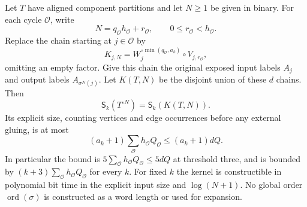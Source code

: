 \begin{theorem}
\label{thm:route-kernel}
Let $T$ have aligned component partitions and let $N\geq1$ be given in binary.
For each cycle $\mathcal O$, write
\[
 N=q_{\mathcal O}h_{\mathcal O}+r_{\mathcal O},
 \qquad 0\leq r_{\mathcal O}<h_{\mathcal O}.
\]
Replace the chain starting at $j\in\mathcal O$ by
\[
 K_{j,N}
 =W_j^{\circ\min(q_{\mathcal O},a_k)}
      \circ V_{j,r_{\mathcal O}},
\]
omitting an empty factor.  Give this chain the original exposed input labels
$A_j$ and output labels $A_{\sigma^N(j)}$.  Let $K(T,N)$ be the disjoint union
of these $d$ chains.  Then
\[
 \mathsf S_k(T^{\circ N})=\mathsf S_k(K(T,N)).
\]
Its explicit size, counting vertices and edge occurrences before any external
gluing, is at most
\[
 (a_k+1)\sum_{\mathcal O}h_{\mathcal O}Q_{\mathcal O}
 \leq (a_k+1)dQ.
\]
In particular the bound is $5\sum_{\mathcal O}h_{\mathcal O}Q_{\mathcal O}
\leq5dQ$ at threshold three, and is bounded by
$(k+3)\sum_{\mathcal O}h_{\mathcal O}Q_{\mathcal O}$ for every $k$.
For fixed $k$ the kernel is constructible in polynomial bit time in the explicit
input size and $\log(N+1)$.  No global order $\operatorname{ord}(\sigma)$ is
constructed as a word length or used for expansion.
\end{theorem}

